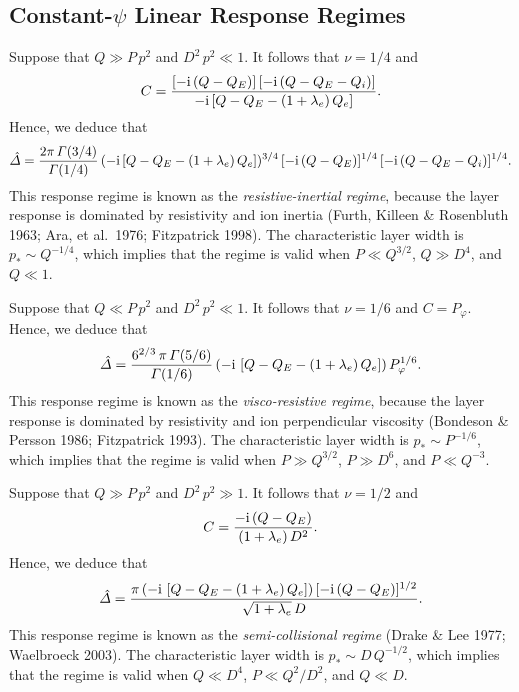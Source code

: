 \documentclass[notitlepage,12pt]{article}
\begin{document}
\subsection{Constant-$\psi$ Linear Response Regimes}\label{scp}
Suppose that $Q\gg P\,p^2$ and $D^2\,p^2 \ll 1$. It follows that $\nu=1/4$ and
\begin{equation}
C = \frac{[-{\rm i}\,(Q-Q_E)]\,[-{\rm i}\,(Q-Q_E-Q_i)]}{-{\rm i}\,[Q-Q_E-(1+\lambda_e)\,Q_e]}.
\end{equation}
Hence, we deduce that
\begin{equation}\label{ri}
\hat{\mit\Delta} = \frac{2\pi\,{\mit\Gamma}(3/4)}{{\mit\Gamma}(1/4)}\,(-{\rm i}\,[Q-Q_E-(1+\lambda_e)\,Q_e])^{3/4}\,[-{\rm i}\,(Q-Q_E)]^{1/4}\,[-{\rm i}\,(Q-Q_E-Q_i)]^{1/4}.
\end{equation}
This response regime is known as the {\em resistive-inertial regime}, because the layer response is dominated by
resistivity and ion inertia (Furth, Killeen \& Rosenbluth 1963; Ara, et al.\ 1976; Fitzpatrick 1998). The characteristic layer width is $p_\ast \sim Q^{-1/4}$,
which implies that the regime is valid when $P\ll Q^{3/2}$, $Q\gg D^4$, and $Q\ll 1$. 

Suppose that $Q\ll P\,p^2$ and $D^2\,p^2\ll 1$. It follows that $\nu=1/6$ and $C=P_\varphi$. 
Hence, we deduce that
\begin{equation}\label{vr}
\hat{\mit\Delta} = \frac{6^{2/3}\,\pi\,{\mit\Gamma}(5/6)}{{\mit\Gamma}(1/6)}\, (-{\rm i}\,\left[Q-Q_E-(1+\lambda_e)\,Q_e\right])\,P_\varphi^{1/6}.
\end{equation}
This response regime is known as the {\em visco-resistive regime}, because the layer response is dominated by
resistivity and  ion perpendicular viscosity (Bondeson \& Persson 1986; Fitzpatrick 1993). The characteristic layer width is $p_\ast \sim P^{-1/6}$, which implies that
the regime is valid when  $P\gg Q^{3/2}$, $P\gg D^6$, and $P\ll Q^{-3}$. 

Suppose that $Q\gg P\,p^2$ and $D^2\,p^2\gg 1$. It follows that $\nu=1/2$ and
\begin{equation}
C = \frac{-{\rm i}\,(Q-Q_E)}{(1+\lambda_e)\,D^2}.
\end{equation}
Hence, we deduce that
\begin{equation}\label{sc}
\hat{\mit\Delta}= \frac{\pi\,(-{\rm i}\,\left[Q-Q_E-(1+\lambda_e)\,Q_e\right])\,[-{\rm i}\,(Q-Q_E)]^{1/2}}{\sqrt{1+\lambda_e}\,D}.
\end{equation}
This response regime is known as the {\em semi-collisional regime}\/ (Drake \& Lee 1977; Waelbroeck 2003). The characteristic
layer width is $p_\ast\sim D\,Q^{-1/2}$, which implies that the regime is valid when $Q\ll D^4$,
 $P\ll Q^2/D^2$, and $Q\ll D$. 
\end{document}
